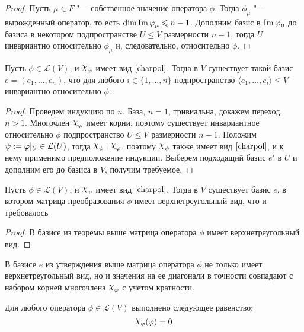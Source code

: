 \begin{proof}
	Пусть $\mu \in F$ "--- собственное значение оператора $\phi$. Тогда $\phi_\mu$ "--- вырожденный оператор, то есть $\dim{\operatorname{Im}{\ensuremath{\varphi}_\mu}} \leqslant n - 1$. Дополним базис в $\operatorname{Im}{\varphi_\mu}$ до базиса в некотором подпространстве $U \le V$ размерности $n - 1$, тогда $U$ инвариантно относительно $\phi_\mu$ и, следовательно, относительно $\phi$.
\end{proof}

\begin{theorem}
	Пусть $\phi \in \mathcal{L}(V)$, и $\Chi_\phi$ имеет вид $\eqref*{charpol}$. Тогда в $V$ существует такой базис $e = (\overline{e_1}, \dots, \overline{e_n})$, что для любого $i \in \{1, \dots, n\}$ подпространство $\langle\overline{e_1}, \dots, \overline{e_i}\rangle \le V$ инвариантно относительно $\phi$.
\end{theorem}

\begin{proof}
	Проведем индукцию по $n$. База, $n = 1$, тривиальна, докажем переход, $n > 1$. Многочлен $\Chi_\phi$ имеет корни, поэтому существует инвариантное относительно $\phi$ подпространство $U \le V$ размерности $n - 1$. Положим $\psi := \phi|_U \hm{\in} \mathcal{L}(U)$, тогда $\Chi_\psi\mid \Chi_\phi$, поэтому $\Chi_\psi$ также имеет вид $\eqref*{charpol}$, и к нему применимо предположение индукции. Выберем подходящий базис $e'$ в $U$ и дополним его до базиса в $V$, получим требуемое.
\end{proof}

\begin{corollary}
	Пусть $\phi \in \mathcal{L}(V)$, и $\Chi_\phi$ имеет вид $\eqref*{charpol}$. Тогда в $V$ существует базис $e$, в котором матрица преобразования $\phi$ имеет верхнетреугольный вид, что и требовалось
\end{corollary}

\begin{proof}
	В базисе из теоремы выше матрица оператора $\phi$ имеет верхнетреугольный вид.
\end{proof}

\begin{note}
	В базисе $e$ из утверждения выше матрица оператора $\phi$ не только имеет верхнетреугольный вид, но и значения на ее диагонали в точности совпадают с набором корней многочлена $\Chi_\phi$ с учетом кратности.
\end{note}

\begin{theorem}
	Для любого оператора $\phi \in \mathcal{L}(V)$ выполнено следующее равенство:
	\[\Chi_\phi(\phi) = 0\]
\end{theorem}

